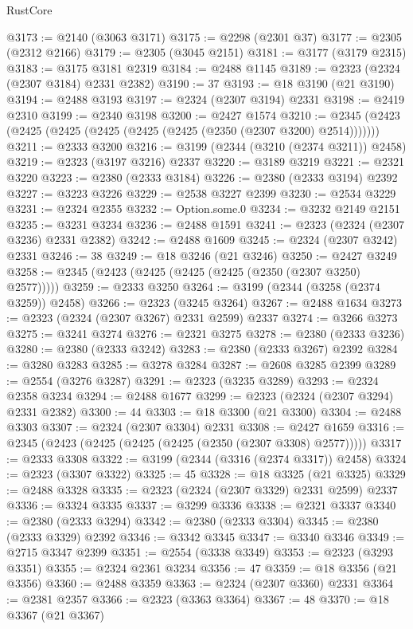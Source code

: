 \begin{lexlean}{RustCore}
\begin{coremodule}
@3173 := @2140 (@3063 @3171)
@3175 := @2298 (@2301 @37)
@3177 := @2305 (@2312 @2166)
@3179 := @2305 (@3045 @2151)
@3181 := @3177 (@3179 @2315)
@3183 := @3175 @3181 @2319
@3184 := @2488 @1145
@3189 := @2323 (@2324 (@2307 @3184) @2331 @2382)
@3190 := 37
@3193 := @18 @3190 (@21 @3190)
@3194 := @2488 @3193
@3197 := @2324 (@2307 @3194) @2331
@3198 := @2419 @2310
@3199 := @2340 @3198
@3200 := @2427 @1574
@3210 := @2345 (@2423 (@2425 (@2425 (@2425 (@2425 (@2425 (@2350 (@2307 @3200) @2514)))))))
@3211 := @2333 @3200
@3216 := @3199 (@2344 (@3210 (@2374 @3211)) @2458)
@3219 := @2323 (@3197 @3216) @2337
@3220 := @3189 @3219
@3221 := @2321 @3220
@3223 := @2380 (@2333 @3184)
@3226 := @2380 (@2333 @3194) @2392
@3227 := @3223 @3226
@3229 := @2538 @3227 @2399
@3230 := @2534 @3229
@3231 := @2324 @2355
@3232 := Option.some.{0}
@3234 := @3232 @2149 @2151
@3235 := @3231 @3234
@3236 := @2488 @1591
@3241 := @2323 (@2324 (@2307 @3236) @2331 @2382)
@3242 := @2488 @1609
@3245 := @2324 (@2307 @3242) @2331
@3246 := 38
@3249 := @18 @3246 (@21 @3246)
@3250 := @2427 @3249
@3258 := @2345 (@2423 (@2425 (@2425 (@2425 (@2350 (@2307 @3250) @2577)))))
@3259 := @2333 @3250
@3264 := @3199 (@2344 (@3258 (@2374 @3259)) @2458)
@3266 := @2323 (@3245 @3264)
@3267 := @2488 @1634
@3273 := @2323 (@2324 (@2307 @3267) @2331 @2599) @2337
@3274 := @3266 @3273
@3275 := @3241 @3274
@3276 := @2321 @3275
@3278 := @2380 (@2333 @3236)
@3280 := @2380 (@2333 @3242)
@3283 := @2380 (@2333 @3267) @2392
@3284 := @3280 @3283
@3285 := @3278 @3284
@3287 := @2608 @3285 @2399
@3289 := @2554 (@3276 @3287)
@3291 := @2323 (@3235 @3289)
@3293 := @2324 @2358 @3234
@3294 := @2488 @1677
@3299 := @2323 (@2324 (@2307 @3294) @2331 @2382)
@3300 := 44
@3303 := @18 @3300 (@21 @3300)
@3304 := @2488 @3303
@3307 := @2324 (@2307 @3304) @2331
@3308 := @2427 @1659
@3316 := @2345 (@2423 (@2425 (@2425 (@2425 (@2350 (@2307 @3308) @2577)))))
@3317 := @2333 @3308
@3322 := @3199 (@2344 (@3316 (@2374 @3317)) @2458)
@3324 := @2323 (@3307 @3322)
@3325 := 45
@3328 := @18 @3325 (@21 @3325)
@3329 := @2488 @3328
@3335 := @2323 (@2324 (@2307 @3329) @2331 @2599) @2337
@3336 := @3324 @3335
@3337 := @3299 @3336
@3338 := @2321 @3337
@3340 := @2380 (@2333 @3294)
@3342 := @2380 (@2333 @3304)
@3345 := @2380 (@2333 @3329) @2392
@3346 := @3342 @3345
@3347 := @3340 @3346
@3349 := @2715 @3347 @2399
@3351 := @2554 (@3338 @3349)
@3353 := @2323 (@3293 @3351)
@3355 := @2324 @2361 @3234
@3356 := 47
@3359 := @18 @3356 (@21 @3356)
@3360 := @2488 @3359
@3363 := @2324 (@2307 @3360) @2331
@3364 := @2381 @2357
@3366 := @2323 (@3363 @3364)
@3367 := 48
@3370 := @18 @3367 (@21 @3367)

\end{coremodule}
\end{lexlean}
